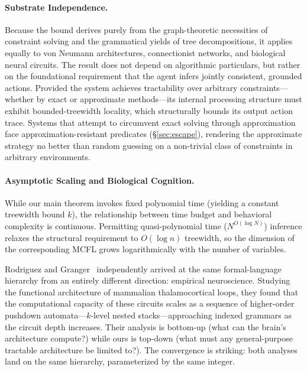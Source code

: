 \documentclass[11pt,a4paper]{article}
\theoremstyle{plain}
\theoremstyle{definition}
\theoremstyle{remark}
\begin{document}
\paragraph{Substrate Independence.}
Because the bound derives purely from the graph-theoretic necessities of constraint solving and the grammatical yields of tree decompositions, it applies equally to von Neumann architectures, connectionist networks, and biological neural circuits. The result does not depend on algorithmic particulars, but rather on the foundational requirement that the agent infers jointly consistent, grounded actions. Provided the system achieves tractability over arbitrary constraints---whether by exact or approximate methods---its internal processing structure must exhibit bounded-treewidth locality, which structurally bounds its output action trace. Systems that attempt to circumvent exact solving through approximation face approximation-resistant predicates (\S\ref{sec:escape}), rendering the approximate strategy no better than random guessing on a non-trivial class of constraints in arbitrary environments.

\paragraph{Asymptotic Scaling and Biological Cognition.}
While our main theorem invokes fixed polynomial time (yielding a constant treewidth bound $k$), the relationship between time budget and behavioral complexity is continuous.
Permitting quasi-polynomial time ($N^{O(\log N)}$) inference relaxes the structural requirement to $O(\log n)$ treewidth, so the dimension of the corresponding MCFL grows logarithmically with the number of variables.

Rodriguez and Granger~\cite{Rodriguez16} independently arrived at the same formal-language hierarchy from an entirely different direction: empirical neuroscience.
Studying the functional architecture of mammalian thalamocortical loops, they found that the computational capacity of these circuits scales as a sequence of higher-order pushdown automata---$k$-level nested stacks---approaching indexed grammars as the circuit depth increases.
Their analysis is bottom-up (what can the brain's architecture compute?) while ours is top-down (what must any general-purpose tractable architecture be limited to?).
The convergence is striking: both analyses land on the same hierarchy, parameterized by the same integer.
\end{document}
